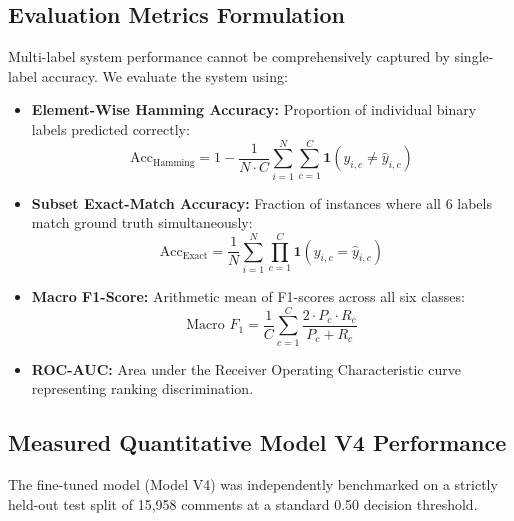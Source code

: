 \documentclass[12pt,a4paper]{article}
\begin{document}
\subsection{Evaluation Metrics Formulation}
Multi-label system performance cannot be comprehensively captured by single-label accuracy. We evaluate the system using:
\begin{itemize}
    \item \textbf{Element-Wise Hamming Accuracy:} Proportion of individual binary labels predicted correctly:
    \begin{equation}
        \text{Acc}_{\text{Hamming}} = 1 - \frac{1}{N \cdot C} \sum_{i=1}^N \sum_{c=1}^C \mathbf{1}(y_{i,c} \neq \hat{y}_{i,c})
    \end{equation}
    \item \textbf{Subset Exact-Match Accuracy:} Fraction of instances where all 6 labels match ground truth simultaneously:
    \begin{equation}
        \text{Acc}_{\text{Exact}} = \frac{1}{N} \sum_{i=1}^N \prod_{c=1}^C \mathbf{1}(y_{i,c} = \hat{y}_{i,c})
    \end{equation}
    \item \textbf{Macro F1-Score:} Arithmetic mean of F1-scores across all six classes:
    \begin{equation}
        \text{Macro } F_1 = \frac{1}{C}\sum_{c=1}^C \frac{2 \cdot P_c \cdot R_c}{P_c + R_c}
    \end{equation}
    \item \textbf{ROC-AUC:} Area under the Receiver Operating Characteristic curve representing ranking discrimination.
\end{itemize}

\subsection{Measured Quantitative Model V4 Performance}
The fine-tuned model (Model V4) was independently benchmarked on a strictly held-out test split of 15,958 comments at a standard 0.50 decision threshold.
\end{document}
